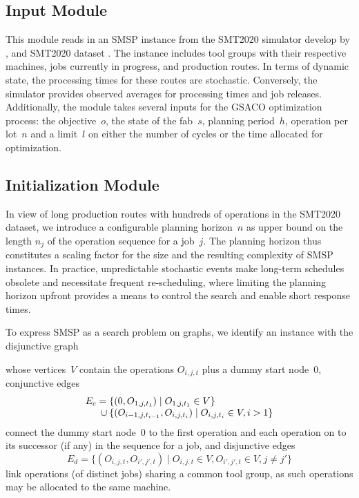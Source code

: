 \subsection{Input Module}
This module reads in an SMSP instance from the SMT2020 simulator develop by \cite{Kovacs2022}, 
and SMT2020 dataset \cite{kopp2020smt2020}.
The instance includes tool groups with their respective machines, jobs currently in progress, and production routes. In terms of dynamic state, the processing times for these routes are stochastic. Conversely, the simulator provides observed averages for processing times and job releases. Additionally, the module takes several inputs for the GSACO optimization process: the objective~$o$, the state of the fab~$s$, planning period~$h$, 
operation per lot~$n$ and a limit~$l$ on either the number of cycles or the time allocated for optimization.


\subsection{Initialization Module}
\label{subsec:initialization}
In view of long production routes with hundreds of operations
in the SMT2020 dataset, we introduce a configurable planning horizon~$n$
as upper bound on the length $n_j$ of the operation sequence for a job~$j$.
The planning horizon thus constitutes a scaling factor for the size and
the resulting complexity of SMSP instances.
In practice, unpredictable stochastic events make long-term schedules obsolete and necessitate frequent re-scheduling,
where limiting the planning horizon upfront provides a means to
control the search and enable short response times.

To express SMSP as a search problem on graphs,
we identify an instance with the disjunctive graph

whose vertices~$V$ contain the operations $O_{i,j,t}$ plus
a dummy start node~$0$,
conjunctive edges\linebreak[1]%
%
\begin{equation}
	\begin{array}{@{}r@{}l@{}}
		E_c = {}
		& \{(0,O_{1,j,t_1}) \mid O_{1,j,t_1}\in V\}
		\\ {} \cup {}
		& \{(O_{i-1,j,t_{i-1}},O_{i,j,t_i}) \mid O_{i,j,t_i}\in V, i > 1\}
	\end{array}
\end{equation}
%
connect the dummy start node~$0$ to the first operation
and each operation on to its successor (if any) in the sequence for a job,
and disjunctive edges\linebreak[1]%
%
\begin{equation}
	E_d = \{(O_{i,j,t},O_{i',j',t}) \mid O_{i,j,t}\in V,O_{i',j',t}\in V, j\neq j'\}
\end{equation}
%
link operations (of distinct jobs) sharing a common tool group,
as such operations may be allocated to the same machine.

